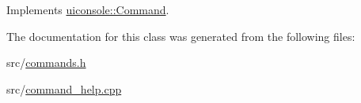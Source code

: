 Implements \hyperlink{classuiconsole_1_1Command_a5c4d205b1de13a6b3d0db73ddc7ebefa}{uiconsole::Command}.



The documentation for this class was generated from the following files:\begin{DoxyCompactItemize}
\item 
src/\hyperlink{commands_8h}{commands.h}\item 
src/\hyperlink{command__help_8cpp}{command\_\-help.cpp}\end{DoxyCompactItemize}
